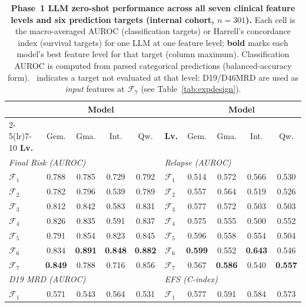\documentclass[pdflatex,sn-nature]{sn-jnl}
\begin{document}
\begin{table}[!t]
\caption{\textbf{Phase~1 LLM zero-shot performance across all seven clinical feature levels and six prediction targets (internal cohort, $n=301$).} Each cell is the macro-averaged AUROC (classification targets) or Harrell's concordance index (survival targets) for one LLM at one feature level; \textbf{bold} marks each model's best feature level for that target (column maximum). Classification AUROC is computed from parsed categorical predictions (balanced-accuracy form). \textemdash{}~indicates a target not evaluated at that level: D19/D46MRD are used as \emph{input} features at $\mathcal{F}_7$ (see Table~\ref{tab:expdesign}).}
\label{tab:phase1_full}
\centering
\small
\setlength{\tabcolsep}{4pt}
\begin{tabular}{l cccc @{\hskip 1.6em} l cccc}
\toprule
 & \multicolumn{4}{c}{\textbf{Model}} & & \multicolumn{4}{c}{\textbf{Model}} \\
\cmidrule(lr){2-5}\cmidrule(lr){7-10}
\textbf{Lv.} & Gem. & Gma. & Int. & Qw. & \textbf{Lv.} & Gem. & Gma. & Int. & Qw. \\
\midrule
\multicolumn{5}{l}{\textit{Final Risk (AUROC)}} & \multicolumn{5}{l}{\textit{Relapse (AUROC)}} \\
$\mathcal{F}_1$ & 0.788 & 0.785 & 0.729 & 0.792 & $\mathcal{F}_1$ & 0.514 & 0.572 & 0.566 & 0.530 \\
$\mathcal{F}_2$ & 0.782 & 0.796 & 0.539 & 0.789 & $\mathcal{F}_2$ & 0.557 & 0.564 & 0.519 & 0.526 \\
$\mathcal{F}_3$ & 0.812 & 0.842 & 0.583 & 0.831 & $\mathcal{F}_3$ & 0.577 & 0.572 & 0.503 & 0.503 \\
$\mathcal{F}_4$ & 0.826 & 0.835 & 0.591 & 0.837 & $\mathcal{F}_4$ & 0.575 & 0.555 & 0.500 & 0.552 \\
$\mathcal{F}_5$ & 0.791 & 0.854 & 0.823 & 0.845 & $\mathcal{F}_5$ & 0.596 & 0.558 & 0.554 & 0.504 \\
$\mathcal{F}_6$ & 0.834 & \textbf{0.891} & \textbf{0.848} & \textbf{0.882} & $\mathcal{F}_6$ & \textbf{0.599} & 0.552 & \textbf{0.643} & 0.546 \\
$\mathcal{F}_7$ & \textbf{0.849} & 0.788 & 0.716 & 0.856 & $\mathcal{F}_7$ & 0.567 & \textbf{0.586} & 0.540 & \textbf{0.557} \\
\multicolumn{5}{l}{\textit{D19 MRD (AUROC)}} & \multicolumn{5}{l}{\textit{EFS (C-index)}} \\
$\mathcal{F}_1$ & 0.571 & 0.543 & 0.564 & 0.531 & $\mathcal{F}_1$ & 0.577 & 0.591 & 0.584 & 0.573 \\

\end{tabular}
\end{table}
\end{document}
